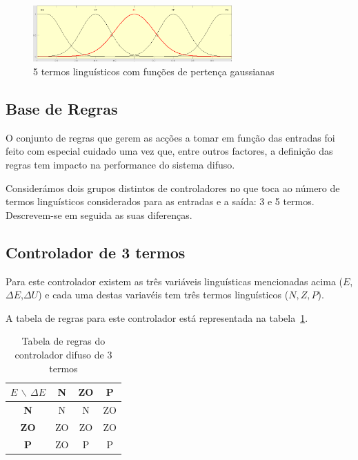 \documentclass{article}
\begin{document}
\begin{figure}[!h]
  \centering
  \includegraphics[width=3in]{figures/gauss5}
  \caption{5 termos linguísticos com funções de pertença gaussianas}
  \label{gauss_5}
\end{figure}

\subsection{Base de Regras}
\indent \indent O conjunto de regras que gerem as acções a tomar em função das entradas foi feito com especial cuidado uma vez que, entre outros factores, a definição das regras tem impacto na performance do sistema difuso.

Considerámos dois grupos distintos de controladores no que toca ao número de termos linguísticos considerados para as entradas e a saída: 3 e 5 termos. Descrevem-se em seguida as suas diferenças.

\subsection{Controlador de 3 termos}
\indent \indent Para este controlador existem as três variáveis linguísticas mencionadas acima ($E$,$\Delta E$,$\Delta U$) e cada uma destas variavéis tem três termos linguísticos (${N,Z,P}$).

A tabela de regras para este controlador está representada na tabela~\ref{3_terms_fuzzy}.

\begin{table}[!h]
\centering
	\caption{Tabela de regras do controlador difuso de 3 termos}
	\label{3_terms_fuzzy}
	\begin{tabular}{|c|c|c|c|}
	\hline
	$E$ $\backslash$ $\Delta E$ & \textbf{N} & \textbf{ZO} & \textbf{P} \\ 
	\hline 
	\textbf{N} & N & N & ZO \\ 
	\hline 
	\textbf{ZO} & ZO & ZO & ZO \\ 
	\hline 
	\textbf{P} & ZO & P & P \\ 
	\hline 
	\end{tabular} 
\end{table}
\end{document}
